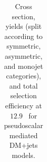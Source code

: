 \begin{table}
{\begin{tabular}{rrlrrrrr}
    \hline\hline
    \end{tabular}
    }
    \caption{Cross section, yields (split according to symmetric, asymmetric, 
        and monojet categories), and total selection efficiency at $12.9$~\ifb 
        for pseudoscalar mediated DM+jets models.}
    \label{tab:DMPS_yld}
\end{table}

